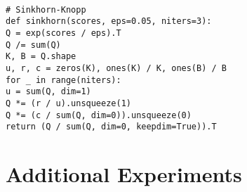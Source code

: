 \documentclass{article}
\newcommand{\code}[1]{\texttt{#1}}
\newcommand{\com}[1]{{\color{pretty-blue}\texttt{#1}}}
\newcommand\tab[1][5mm]{\hspace*{#1}}
\begin{document}
\\
\com{\# Sinkhorn-Knopp}
\\
\code{def sinkhorn(scores, eps=0.05, niters=3):}
\\
\tab \code{Q = exp(scores / eps).T}
\\
\tab \code{Q /= sum(Q)}
\\
\tab \code{K, B = Q.shape}
\\
\tab \code{u, r, c = zeros(K), ones(K) / K, ones(B) / B}
\\
\tab \code{for \_ in range(niters):}
\\
\tab \tab \code{u = sum(Q, dim=1)}
\\
\tab \tab \code{Q *= (r / u).unsqueeze(1)}
\\
\tab \tab \code{Q *= (c / sum(Q, dim=0)).unsqueeze(0)}
\\
\tab \code{return (Q / sum(Q, dim=0, keepdim=True)).T}
\\
\section{Additional Experiments}\label{app:add_exp}
\end{document}
